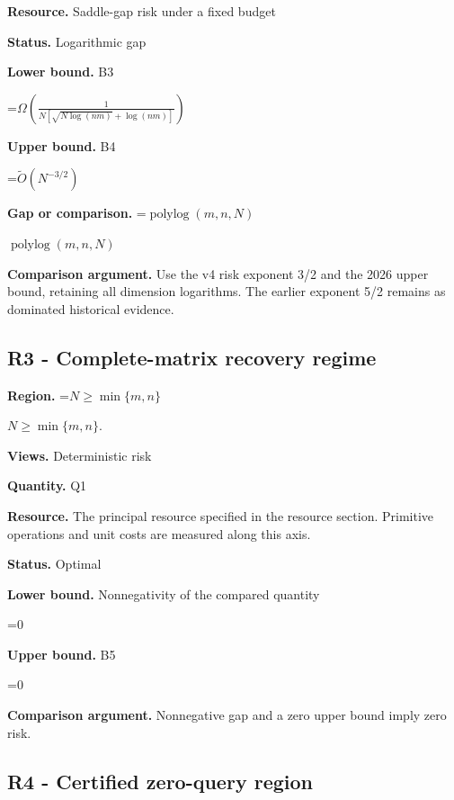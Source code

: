 \documentclass[10pt,a4paper]{article}
\newcommand{\AtlasMath}[1]{\par\begingroup\centering\setbox0=\hbox{$\displaystyle #1$}\ifdim\wd0>1.4\linewidth\typeout{ATLAS WIDE FORMULA: \the\wd0}\fi\ifdim\wd0>\linewidth\resizebox{\linewidth}{!}{\box0}\else\box0\fi\par\endgroup}
\newcommand{\AtlasInlineMath}[1]{\begingroup\setbox0=\hbox{$#1$}\ifdim\wd0>.4\linewidth\endgroup\AtlasMath{#1}\else\endgroup$#1$\fi}
\begin{document}
\textbf{Resource.} Saddle-gap risk under a fixed budget



\textbf{Status.} Logarithmic gap



\textbf{Lower bound.} B3



\AtlasMath{\Omega\!\left(\frac{1}{N[\sqrt{N\log(nm)}+\log(nm)]}\right)}


\textbf{Upper bound.} B4



\AtlasMath{\widetilde{O}(N^{-3/2})}


\textbf{Gap or comparison.} \AtlasInlineMath{\operatorname{polylog}(m,n,N)}



\textbf{Comparison argument.} Use the v4 risk exponent 3/2 and the 2026 upper bound, retaining all dimension logarithms. The earlier exponent 5/2 remains as dominated historical evidence.



\subsection{R3 - Complete-matrix recovery regime}


\textbf{Region.} \AtlasInlineMath{N\ge\min\{m,n\}}.



\textbf{Views.} Deterministic risk



\textbf{Quantity.} Q1



\textbf{Resource.} The principal resource specified in the resource section. Primitive operations and unit costs are measured along this axis.



\textbf{Status.} Optimal



\textbf{Lower bound.} Nonnegativity of the compared quantity



\AtlasMath{0}


\textbf{Upper bound.} B5



\AtlasMath{0}


\textbf{Comparison argument.} Nonnegative gap and a zero upper bound imply zero risk.



\subsection{R4 - Certified zero-query region}
\end{document}

